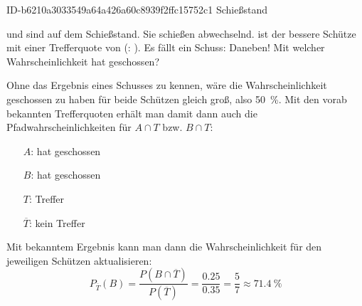 \begin{exercise}
      {ID-b6210a3033549a64a426a60c8939f2ffc15752c1}
      {Schießstand}
  \ifproblem\problem\par
    \xya{} und \xyb{} sind auf dem Schießstand.
    Sie schießen abwechselnd. \xya{} ist der
    bessere Schütze mit einer Trefferquote von
     (\xyb: ). Es fällt ein Schuss:
    Daneben! Mit welcher Wahrscheinlichkeit hat
    \xyb{} geschossen?
  \fi
  \ifoutcome\outcome\par
    Ohne das Ergebnis eines Schusses zu kennen,
    wäre die Wahrscheinlichkeit geschossen zu
    haben für beide Schützen gleich groß, also
    \SI{50}{\percent}.
    Mit den vorab bekannten Trefferquoten
    erhält man damit dann auch die
    Pfadwahrscheinlichkeiten für $A\cap T$
    bzw. $B\cap T$:
    \par
    \begin{minipage}[c]{0.39\linewidth}
      \begin{fofotab}%
      \end{fofotab}
    \end{minipage}%
    \begin{minipage}[c]{0.49\linewidth}
      \begin{itemize}
        \renewcommand{\itemsep}{-1ex}%
        \item[$A$:] \glqq\xya{} hat geschossen\grqq
        \item[$B$:] \glqq\xyb{} hat geschossen\grqq
        \item[$T$:] \glqq Treffer\grqq
        \item[$\overline{T}$:] \glqq kein Treffer\grqq
      \end{itemize}
    \end{minipage}%
    \par
    Mit bekanntem Ergebnis kann man dann die
    Wahrscheinlichkeit für den jeweiligen
    Schützen aktualisieren:
    \begin{equation*}
      P_{\overline{T}}(B)
      =\frac{P(B\cap\overline{T})}{P(\overline{T})}
      =\frac{\num{0.25}}{\num{0.35}}
      =\frac{5}{7}
      \approx\SI{71.4}{\percent}
    \end{equation*}
  \fi
\end{exercise}
